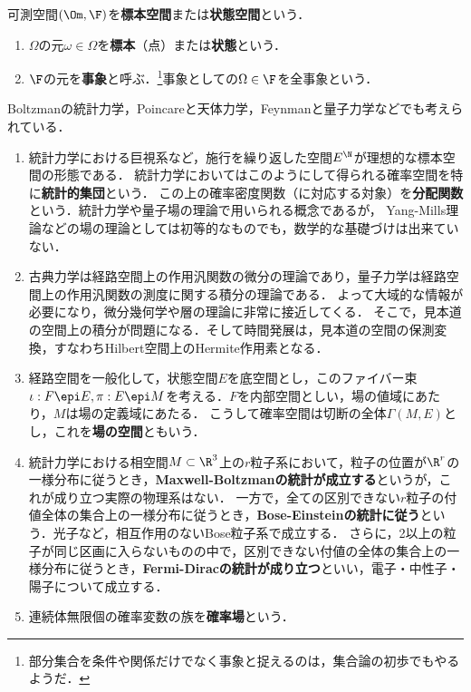 \documentclass[uplatex,dvipdfmx]{jsreport}
\begin{document}
\begin{definition}
    可測空間$(\Om,\F)$を\textbf{標本空間}または\textbf{状態空間}という．
    \begin{enumerate}
        \item $\Omega$の元$\omega\in\Omega$を\textbf{標本}（点）または\textbf{状態}という．
        \item $\F$の元を\textbf{事象}と呼ぶ．\footnote{部分集合を条件や関係だけでなく事象と捉えるのは，集合論の初歩でもやるようだ．}事象としての$\Omega\in\F$を全事象という．
    \end{enumerate}
\end{definition}
\begin{example}
    Boltzmanの統計力学，Poincareと天体力学，Feynmanと量子力学などでも考えられている．
    \begin{enumerate}
        \item 統計力学における巨視系など，施行を繰り返した空間$E^\N$が理想的な標本空間の形態である．
        統計力学においてはこのようにして得られる確率空間を特に\textbf{統計的集団}という．
        この上の確率密度関数（に対応する対象）を\textbf{分配関数}という．統計力学や量子場の理論で用いられる概念であるが，
        Yang-Mills理論などの場の理論としては初等的なものでも，数学的な基礎づけは出来ていない．
        \item 古典力学は経路空間上の作用汎関数の微分の理論であり，量子力学は経路空間上の作用汎関数の測度に関する積分の理論である．
        よって大域的な情報が必要になり，微分幾何学や層の理論に非常に接近してくる．
        そこで，見本道の空間上の積分が問題になる．そして時間発展は，見本道の空間の保測変換，すなわちHilbert空間上のHermite作用素となる．
        \item 経路空間を一般化して，状態空間$E$を底空間とし，このファイバー束$\iota:F\epi E,\pi:E\epi M$を考える．$F$を内部空間としい，場の値域にあたり，$M$は場の定義域にあたる．
        こうして確率空間は切断の全体$\Gamma(M,E)$とし，これを\textbf{場の空間}ともいう．
        \item 統計力学における相空間$M\subset\R^3$上の$r$粒子系において，粒子の位置が$\R^r$の一様分布に従うとき，\textbf{Maxwell-Boltzmanの統計が成立する}というが，これが成り立つ実際の物理系はない．
        一方で，全ての区別できない$r$粒子の付値全体の集合上の一様分布に従うとき，\textbf{Bose-Einsteinの統計に従う}という．光子など，相互作用のないBose粒子系で成立する．
        さらに，2以上の粒子が同じ区画に入らないものの中で，区別できない付値の全体の集合上の一様分布に従うとき，\textbf{Fermi-Diracの統計が成り立つ}といい，電子・中性子・陽子について成立する．
        \item 連続体無限個の確率変数の族を\textbf{確率場}という．
    \end{enumerate}
\end{example}
\end{document}

